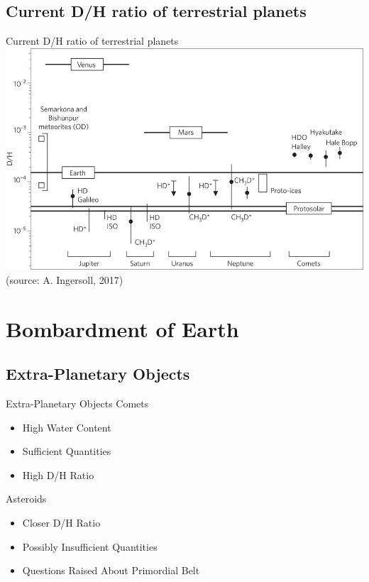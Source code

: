 \documentclass[11pt, aspectratio=169]{beamer}
\begin{document}
\subsection{Current D/H ratio of terrestrial planets}
\begin{frame}[t]{Current D/H ratio of terrestrial planets}
	\centering
	\includegraphics[height=.7\textheight]{figures/dh-ratio-terrestrial-planets.jpg}\\
	\small (source: A. Ingersoll, 2017)
\end{frame}



\section{Bombardment of Earth}
\subsection{Extra-Planetary Objects}
\begin{frame}[t]{Extra-Planetary Objects}
Comets
\begin{itemize}
\item High Water Content
\item Sufficient Quantities
\item High D/H Ratio
\end{itemize}

Asteroids
\begin{itemize}
\item Closer D/H Ratio
\item Possibly Insufficient Quantities
\item Questions Raised About Primordial Belt
\end{itemize}
\end{frame}
\end{document}
